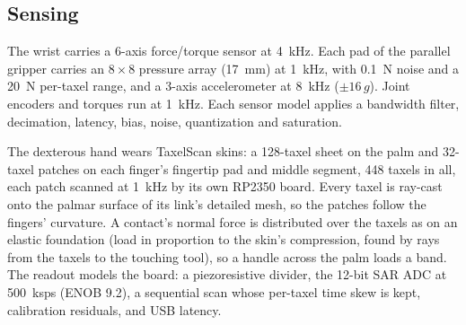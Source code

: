 \subsection{Sensing}
The wrist carries a 6-axis force/torque sensor at \SI{4}{\kilo\hertz}. Each pad of the parallel gripper carries an
$8\times8$ pressure array (\SI{17}{\milli\metre}) at \SI{1}{\kilo\hertz}, with \SI{0.1}{\newton} noise and a
\SI{20}{\newton} per-taxel range, and a 3-axis accelerometer at \SI{8}{\kilo\hertz} ($\pm16\,g$). Joint encoders and
torques run at \SI{1}{\kilo\hertz}. Each sensor model applies a bandwidth filter, decimation, latency, bias, noise,
quantization and saturation.

The dexterous hand wears TaxelScan skins: a 128-taxel sheet on the palm and 32-taxel patches on each finger's
fingertip pad and middle segment, 448 taxels in all, each patch scanned at \SI{1}{\kilo\hertz} by its own RP2350
board. Every taxel is ray-cast onto the palmar surface of its link's detailed mesh, so the patches follow the
fingers' curvature. A contact's normal force is distributed over the taxels as on an elastic foundation (load in
proportion to the skin's compression, found by rays from the taxels to the touching tool), so a handle across the
palm loads a band. The readout models the board: a piezoresistive divider, the 12-bit SAR ADC at
\SI{500}{ksps} (ENOB 9.2), a sequential scan whose per-taxel time skew is kept, calibration residuals, and USB
latency.

